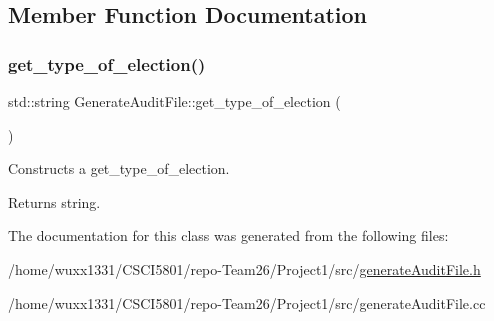 \subsection{Member Function Documentation}
\mbox{\label{classGenerateAuditFile_acd98de766d58b3b55107b998b58810f3}} 
\subsubsection{\texorpdfstring{get\+\_\+type\+\_\+of\+\_\+election()}{get\_type\_of\_election()}}
{\footnotesize\ttfamily std\+::string Generate\+Audit\+File\+::get\+\_\+type\+\_\+of\+\_\+election (\begin{DoxyParamCaption}{ }\end{DoxyParamCaption})}



Constructs a get\+\_\+type\+\_\+of\+\_\+election. 

\begin{DoxyReturn}{Returns}
string. 
\end{DoxyReturn}


The documentation for this class was generated from the following files\+:\begin{DoxyCompactItemize}
\item 
/home/wuxx1331/\+C\+S\+C\+I5801/repo-\/\+Team26/\+Project1/src/\hyperlink{generateAuditFile_8h}{generate\+Audit\+File.\+h}\item 
/home/wuxx1331/\+C\+S\+C\+I5801/repo-\/\+Team26/\+Project1/src/generate\+Audit\+File.\+cc\end{DoxyCompactItemize}
